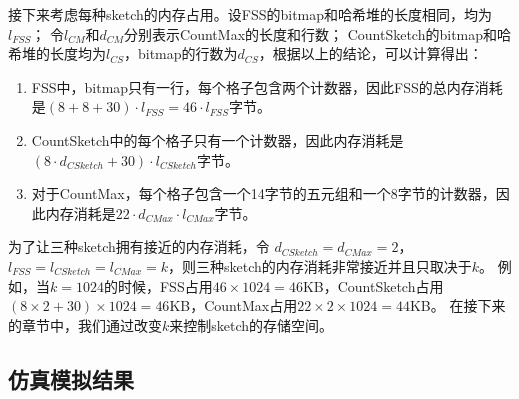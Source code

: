 接下来考虑每种sketch的内存占用。设FSS的bitmap和哈希堆的长度相同，均为$l_{FSS}$；
令$l_{CM}$和$d_{CM}$分别表示CountMax的长度和行数；
CountSketch的bitmap和哈希堆的长度均为$l_{CS}$，bitmap的行数为$d_{CS}$，根据以上的结论，可以计算得出：

\begin{enumerate}
\item 
FSS中，bitmap只有一行，每个格子包含两个计数器，因此FSS的总内存消耗是$(8+8+30)\cdot l_{FSS} = 46\cdot l_{FSS}$字节。
\item CountSketch中的每个格子只有一个计数器，因此内存消耗是$(8\cdot d_{CSketch} + 30)\cdot l_{CSketch}$字节。
\item 对于CountMax，每个格子包含一个14字节的五元组和一个8字节的计数器，因此内存消耗是$22 \cdot d_{CMax}\cdot l_{CMax}$字节。
\end{enumerate}

为了让三种sketch拥有接近的内存消耗，令 $d_{CSketch}=d_{CMax}=2$，$l_{FSS}=l_{CSketch}=l_{CMax}=k$，则三种sketch的内存消耗非常接近并且只取决于$k$。
例如，当$k=1024$的时候，FSS占用$46 \times 1024 = 46$KB，CountSketch占用$(8\times 2 +30)\times 1024 = 46$KB，CountMax占用$22\times 2\times 1024=44$KB。
在接下来的章节中，我们通过改变$k$来控制sketch的存储空间。

\subsection{仿真模拟结果}

